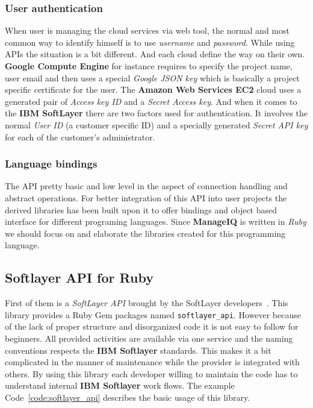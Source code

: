 \subsubsection{User authentication}
\label{subs:User authentication}

When user is managing the cloud services via web tool, the normal and most common way to identify himself is to use \emph{username} and \emph{password}. While using APIs the situation is a bit different. And each cloud define the way on their own. \textbf{Google Compute Engine} for instance requires to specify the project name, user email and then uses a special \emph{Google JSON key} which is basically a project specific certificate for the user. The \textbf{Amazon Web Services EC2} cloud uses a generated pair of \emph{Access key ID} and a \emph{Secret Access key}. And when it comes to the \textbf{IBM SoftLayer} there are two factors used for authentication. It involves the normal \emph{User ID} (a customer specific ID) and a specially generated \emph{Secret API key} for each of the customer's administrator.

\subsubsection{Language bindings}
\label{subs:Language bindings}

The API pretty basic and low level in the aspect of connection handling and abstract operations. For better integration of this API into user projects the derived libraries has been built upon it to offer bindings and object based interface for different programing languages. Since \textbf{ManageIQ} is written in \emph{Ruby} we should focus on and elaborate the libraries created for this programming language.

\subsection{Softlayer API for Ruby}
\label{sub:Softlayer-API}

First of them is a \emph{SoftLayer API} brought by the SoftLayer developers~\cite{softlayer_api}. This library provides a Ruby Gem packages named \texttt{softlayer\_api}. However because of the lack of proper structure and disorganized code it is not easy to follow for beginners. All provided activities are available via one service and the naming conventions respects the \textbf{IBM Softlayer} standards. This makes it a bit complicated in the manner of maintenance while the provider is integrated with others. By using this library each developer willing to maintain the code has to understand internal \textbf{IBM Softlayer} work flows. The example Code~\ref{code:softlayer_api} describes the basic usage of this library.

